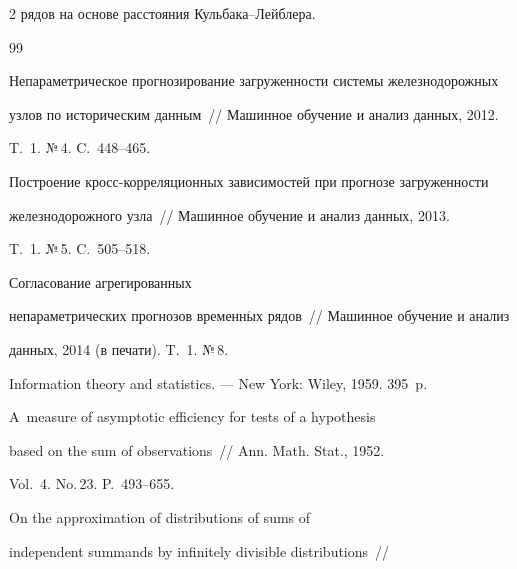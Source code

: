 \begin{multicols}{2}
рядов на основе расстояния Кульбака--Лейблера.



{\small\frenchspacing

{%


\begin{thebibliography}{99}



Непараметрическое прогнозирование загруженности системы железнодорожных

узлов по историческим данным~// Машинное обучение и анализ данных,  2012.

T.~1. №\,4. C.~448--465.



    Построение кросс-корреляционных зависимостей при прогнозе загруженности

    железнодорожного узла~// Машинное обучение и анализ данных,  2013.

    T.~1. №\,5.  C.~505--518.


      Согласование агрегированных

    непараметрических прогнозов временн$\acute{\mbox{ы}}$х рядов~// Машинное обучение и анализ

    данных, 2014  (в печати). T.~1. №\,8.


 Information theory and statistics. --- New York: Wiley, 1959. 395~p.


   A~measure of asymptotic efficiency for tests of a hypothesis

based on the sum of observations~// Ann.  Math. Stat., 1952.

Vol.~4. No.\,23. P.~493--655.


 On the approximation of distributions of sums of

independent summands by infinitely divisible distributions~//


\end{thebibliography}}}
\end{multicols}

